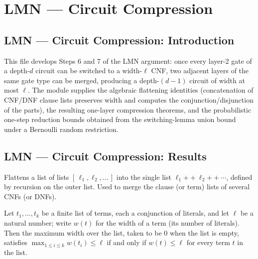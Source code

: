 \section{LMN --- Circuit Compression}
\subsection*{LMN --- Circuit Compression: Introduction}

This file develops Steps 6 and 7 of the LMN argument: once every layer-2 gate of a
depth-$d$ circuit can be switched to a width-$\ell$ CNF, two adjacent layers of the same
gate type can be merged, producing a depth-$(d-1)$ circuit of width at most $\ell$. The
module supplies the algebraic flattening identities (concatenation of CNF/DNF clause
lists preserves width and computes the conjunction/disjunction of the parts), the
resulting one-layer compression theorems, and the probabilistic one-step reduction
bounds obtained from the switching-lemma union bound under a Bernoulli random
restriction.

\subsection*{LMN --- Circuit Compression: Results}

\begin{definition}
\label{LMN.listConcat}
\leanok
Flattens a list of lists $[\,\ell_1, \ell_2, \dots\,]$ into the single list
$\ell_1 \mathbin{+\!\!+} \ell_2 \mathbin{+\!\!+} \cdots$, defined by recursion on the
outer list. Used to merge the clause (or term) lists of several CNFs (or DNFs).
\end{definition}

\begin{lemma}
\label{LMN.width_le_iff_forall}
\leanok
{}
Let $t_1, \dots, t_k$ be a finite list of terms, each a conjunction of literals, and let
$\ell$ be a natural number; write $w(t)$ for the width of a term (its number of
literals). Then the maximum width over the list, taken to be $0$ when the list is empty,
satisfies $\max_{1 \le i \le k} w(t_i) \le \ell$ if and only if $w(t) \le \ell$ for
every term $t$ in the list.
\end{lemma}

